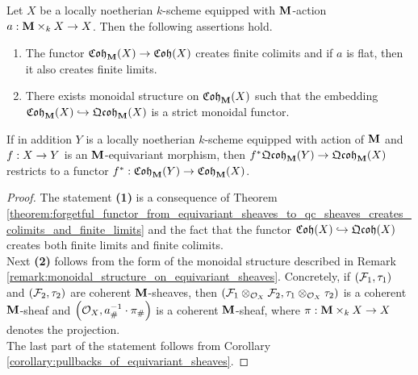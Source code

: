 \begin{corollary}\label{corollary:coherent_equivariant_sheaves_properties}
Let $X$ be a locally noetherian $k$-scheme equipped with $\mathbf{M}$-action $a:\mathbf{M}\times_kX\rightarrow X$. Then the following assertions hold.
\begin{enumerate}[label= \emph{\textbf{(\arabic*)}}, leftmargin=3.0em]
\item The functor $\mathfrak{Coh}_{\mathbf{M}}(X)\rightarrow \mathfrak{Coh}(X)$ creates finite colimits and if $a$ is flat, then it also creates finite limits.
\item There exists monoidal structure on $\mathfrak{Coh}_{\mathbf{M}}(X)$ such that the embedding $\mathfrak{Coh}_{\mathbf{M}}(X)\hookrightarrow \mathfrak{Qcoh}_{\mathbf{M}}(X)$ is a strict monoidal functor.
\end{enumerate}
If in addition $Y$ is a locally noetherian $k$-scheme equipped with action of $\mathbf{M}$ and $f:X\rightarrow Y$ is an $\mathbf{M}$-equivariant morphism, then $f^*\mathfrak{Qcoh}_{\mathbf{M}}(Y)\rightarrow \mathfrak{Qcoh}_{\mathbf{M}}(X)$ restricts to a functor $f^*:\mathfrak{Coh}_{\mathbf{M}}(Y)\rightarrow \mathfrak{Coh}_{\mathbf{M}}(X)$.
\end{corollary}
\begin{proof}
The statement \textbf{(1)} is a consequence of Theorem \ref{theorem:forgetful_functor_from_equivariant_sheaves_to_qc_sheaves_creates_colimits_and_finite_limits} and the fact that the functor $\mathfrak{Coh}(X)\hookrightarrow \mathfrak{Qcoh}(X)$ creates both finite limits and finite colimits.\\
Next \textbf{(2)} follows from the form of the monoidal structure described in Remark \ref{remark:monoidal_structure_on_equivariant_sheaves}. Concretely, if $({\mathcal F}_1,\tau_1)$ and $({\mathcal F}_2,\tau_2)$ are coherent $\mathbf{M}$-sheaves, then $\left({\mathcal F}_1\otimes_{{\mathcal O}_X}{\mathcal F}_2,\tau_1\otimes_{{\mathcal O}_X}\tau_2\right)$ is a coherent $\mathbf{M}$-sheaf and $\left({\mathcal O}_X,a_{\#}^{-1}\cdot \pi_{\#}\right)$ is a coherent $\mathbf{M}$-sheaf, where $\pi:\mathbf{M}\times_kX\rightarrow X$ denotes the projection.\\
The last part of the statement follows from Corollary \ref{corollary:pullbacks_of_equivariant_sheaves}.
\end{proof}

